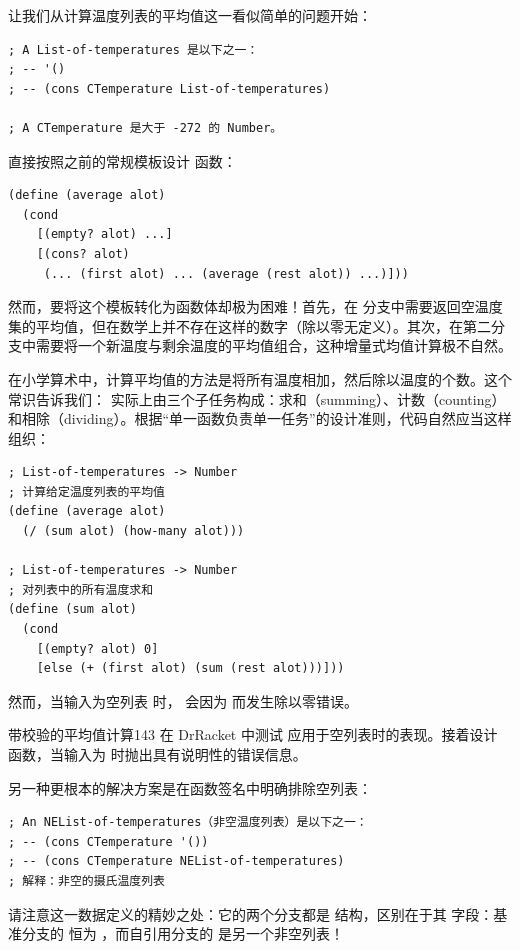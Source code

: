 让我们从计算温度列表的平均值这一看似简单的问题开始：
\begin{lstlisting}[language=BSL]
; A List-of-temperatures 是以下之一：
; -- '()
; -- (cons CTemperature List-of-temperatures)

; A CTemperature 是大于 -272 的 Number。
\end{lstlisting}

直接按照之前的常规模板设计  函数：
\begin{lstlisting}[language=BSL]
(define (average alot)
  (cond
    [(empty? alot) ...]
    [(cons? alot)
     (... (first alot) ... (average (rest alot)) ...)]))
\end{lstlisting}
然而，要将这个模板转化为函数体却极为困难！首先，在  分支中需要返回空温度集的平均值，但在数学上并不存在这样的数字（除以零无定义）。其次，在第二分支中需要将一个新温度与剩余温度的平均值组合，这种增量式均值计算极不自然。

在小学算术中，计算平均值的方法是将所有温度相加，然后除以温度的个数。这个常识告诉我们： 实际上由三个子任务构成：求和（summing）、计数（counting）和相除（dividing）。根据“单一函数负责单一任务”的设计准则，代码自然应当这样组织：
\begin{lstlisting}[language=BSL]
; List-of-temperatures -> Number
; 计算给定温度列表的平均值
(define (average alot)
  (/ (sum alot) (how-many alot)))

; List-of-temperatures -> Number
; 对列表中的所有温度求和
(define (sum alot)
  (cond
    [(empty? alot) 0]
    [else (+ (first alot) (sum (rest alot)))]))
\end{lstlisting}

然而，当输入为空列表  时， 会因为  而发生除以零错误。

\begin{exercise}{带校验的平均值计算}{143}
在 DrRacket 中测试  应用于空列表时的表现。接着设计  函数，当输入为  时抛出具有说明性的错误信息。
\end{exercise}

另一种更根本的解决方案是在函数签名中明确排除空列表：
\begin{lstlisting}[language=BSL]
; An NEList-of-temperatures（非空温度列表）是以下之一：
; -- (cons CTemperature '())
; -- (cons CTemperature NEList-of-temperatures)
; 解释：非空的摄氏温度列表
\end{lstlisting}

请注意这一数据定义的精妙之处：它的两个分支都是  结构，区别在于其  字段：基准分支的  恒为 ，而自引用分支的  是另一个非空列表！

